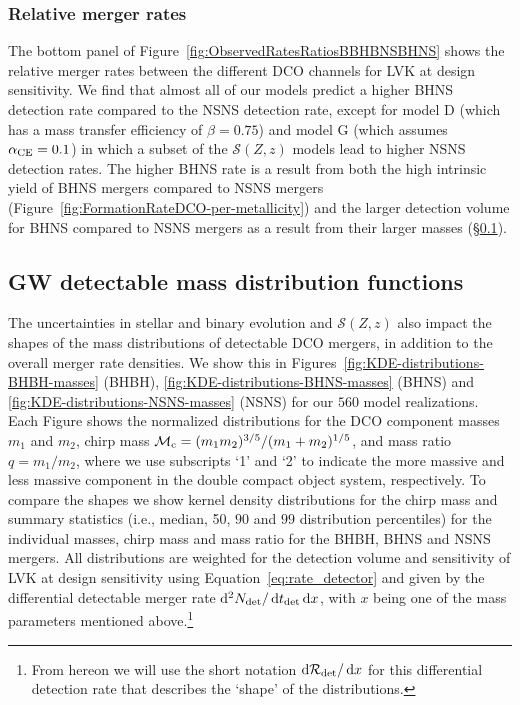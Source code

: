 \documentclass[fleqn,usenatbib]{mnras}
\newcommand{\SFRD}{\ensuremath{\mathcal{S}(Z,z)}\xspace}
\newcommand{\tdet}{\ensuremath{{t}_{\rm{det}}}\xspace}
\newcommand{\Ndet}{\ensuremath{{N}_{\rm{det}}}\xspace}
\newcommand*\diff{\mathop{}\!\mathrm{d}}
\newcommand{\mchirpf}{\ensuremath{{\mathcal{M}}_{\rm{c}}}\xspace}
\newcommand{\Nmodels}{\ensuremath{560}\xspace}
\begin{document}
\subsubsection{Relative merger rates}
%
The bottom panel of  Figure~\ref{fig:ObservedRatesRatiosBBHBNSBHNS} shows the relative merger rates between the different \ac{DCO} channels for LVK at design sensitivity. We find that almost all of our models predict a higher \ac{BHNS} detection rate compared to the \ac{NSNS} detection rate, except for model D (which has a mass transfer efficiency of $\beta=0.75$) and model G (which assumes  $\alpha_{\rm{CE}}=0.1$) in which a subset of the \SFRD models lead to higher \ac{NSNS} detection rates.  The higher \ac{BHNS} rate is a result from both the high intrinsic yield of \ac{BHNS} mergers compared to \ac{NSNS} mergers (Figure~\ref{fig:FormationRateDCO-per-metallicity}) and the larger detection volume for \ac{BHNS} compared to \ac{NSNS} mergers as a result from their larger masses (\S\ref{sec:Detectable-mass-distribution-functions}). 


\subsection{GW detectable mass distribution functions}
\label{sec:Detectable-mass-distribution-functions}

The uncertainties in stellar and binary evolution and \SFRD also impact the shapes of the mass distributions of detectable \ac{DCO} mergers, in addition to the overall merger rate densities. We show this in  Figures~\ref{fig:KDE-distributions-BHBH-masses} (BHBH), \ref{fig:KDE-distributions-BHNS-masses} (BHNS) and \ref{fig:KDE-distributions-NSNS-masses} (NSNS) for our \Nmodels model realizations. Each Figure shows the normalized distributions for the \ac{DCO} component masses $m_1$ and $m_2$, chirp mass $\mchirpf = {(m_{\rm{1}} m_{\rm{2}})^{3/5}}/{(m_{\rm{1}} + m_{\rm{2}})^{1/5}}$, and mass ratio $q = m_1 / m_2$, where we use subscripts `1' and `2' to indicate the more massive and less massive component in the double compact object system, respectively.  
To compare the shapes we show kernel density distributions for the chirp mass and summary statistics (i.e., median, 50, $90$ and $99$ distribution percentiles) for the individual masses, chirp mass and mass ratio for the \ac{BHBH}, \ac{BHNS} and \ac{NSNS} mergers. All distributions are weighted for the detection volume and sensitivity of LVK at design sensitivity using Equation~\ref{eq:rate_detector} and given by the differential detectable merger rate $\diff^{2} \Ndet / \diff \tdet \diff x$, with $x$ being one of the mass parameters mentioned above.\footnote{From hereon we will use the short notation $\diff \mathcal{R}_{\rm{det}} / \diff x$ for this differential detection rate that describes the `shape' of the distributions.} 
\end{document}
